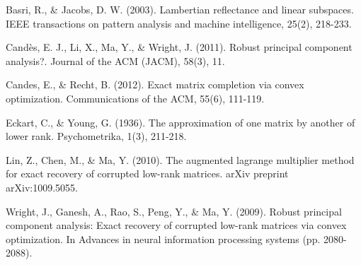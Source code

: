 \documentclass[11pt]{scrartcl} %
\theoremstyle{plain}
\begin{document}
\begin{thebibliography}{9}

 Basri, R., \& Jacobs, D. W. (2003). Lambertian reflectance and linear subspaces. IEEE transactions on pattern analysis and machine intelligence, 25(2), 218-233.

 Candès, E. J., Li, X., Ma, Y., \& Wright, J. (2011). Robust principal component analysis?. Journal of the ACM (JACM), 58(3), 11.

 Candes, E., \& Recht, B. (2012). Exact matrix completion via convex optimization. Communications of the ACM, 55(6), 111-119.

 Eckart, C., \& Young, G. (1936). The approximation of one matrix by another of lower rank. Psychometrika, 1(3), 211-218.

 Lin, Z., Chen, M., \& Ma, Y. (2010). The augmented lagrange multiplier method for exact recovery of corrupted low-rank matrices. arXiv preprint arXiv:1009.5055.

 Wright, J., Ganesh, A., Rao, S., Peng, Y., \& Ma, Y. (2009). Robust principal component analysis: Exact recovery of corrupted low-rank matrices via convex optimization. In Advances in neural information processing systems (pp. 2080-2088).

\end{thebibliography}
\end{document}
